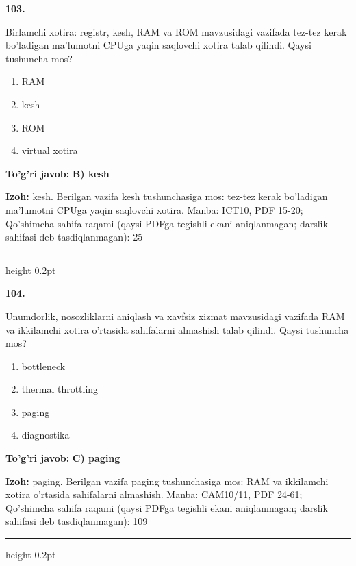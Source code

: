 \documentclass[10pt,a4paper]{article}
\begin{document}
{\bfseries\sffamily\color{ink} 103.}
\par
Birlamchi xotira: registr, kesh, RAM va ROM mavzusidagi vazifada tez-tez kerak bo'ladigan ma'lumotni CPUga yaqin saqlovchi xotira talab qilindi. Qaysi tushuncha mos?
\begin{enumerate}[label=\Alph*),leftmargin=9mm]
\item RAM
\item kesh
\item ROM
\item virtual xotira
\end{enumerate}
\begin{tcolorbox}[enhanced,breakable,colback=teal!4,colframe=teal!60!black,boxrule=0.45pt,arc=1.2mm,left=2.7mm,right=2.7mm,top=1.8mm,bottom=1.8mm,before skip=2mm,after skip=2mm]
{\bfseries\sffamily\color{teal}To'g'ri javob:} \textbf{B) kesh}
\par\smallskip
{\bfseries Izoh:} kesh. Berilgan vazifa kesh tushunchasiga mos: tez-tez kerak bo'ladigan ma'lumotni CPUga yaqin saqlovchi xotira. Manba: ICT10, PDF 15-20; Qo'shimcha sahifa raqami (qaysi PDFga tegishli ekani aniqlanmagan; darslik sahifasi deb tasdiqlanmagan): 25
\end{tcolorbox}
\vspace{2mm}\hrule height 0.2pt\vspace{3mm}

{\bfseries\sffamily\color{ink} 104.}
\par
Unumdorlik, nosozliklarni aniqlash va xavfsiz xizmat mavzusidagi vazifada RAM va ikkilamchi xotira o'rtasida sahifalarni almashish talab qilindi. Qaysi tushuncha mos?
\begin{enumerate}[label=\Alph*),leftmargin=9mm]
\item bottleneck
\item thermal throttling
\item paging
\item diagnostika
\end{enumerate}
\begin{tcolorbox}[enhanced,breakable,colback=teal!4,colframe=teal!60!black,boxrule=0.45pt,arc=1.2mm,left=2.7mm,right=2.7mm,top=1.8mm,bottom=1.8mm,before skip=2mm,after skip=2mm]
{\bfseries\sffamily\color{teal}To'g'ri javob:} \textbf{C) paging}
\par\smallskip
{\bfseries Izoh:} paging. Berilgan vazifa paging tushunchasiga mos: RAM va ikkilamchi xotira o'rtasida sahifalarni almashish. Manba: CAM10/11, PDF 24-61; Qo'shimcha sahifa raqami (qaysi PDFga tegishli ekani aniqlanmagan; darslik sahifasi deb tasdiqlanmagan): 109
\end{tcolorbox}
\vspace{2mm}\hrule height 0.2pt\vspace{3mm}
\end{document}

